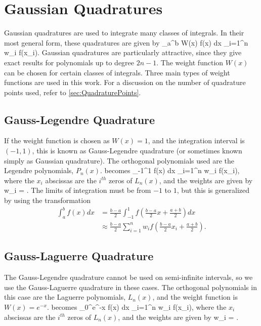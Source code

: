 \documentclass[Dissertation.tex]{subfiles}
\begin{document}
\section{Gaussian Quadratures}
\label{sec:GaussQuad}
Gaussian quadratures are used to integrate many classes of integrals. In their
most general form, these quadratures are given by \cite[p.887]{Abramowitz1965}
\beq
\label{eq:GeneralQuadratures}
\int_a^b W(x) f(x) dx \approx \sum_{i=1}^n w_i f(x_i).
\eeq
Gaussian quadratures are particularly attractive, since they give exact 
results for polynomials up to degree $2n-1$. The weight function $W(x)$ can 
be chosen for certain classes of integrals. Three main types of weight 
functions are used in this work. For a discussion on the number of quadrature 
points used, refer to \cref{sec:QuadraturePoints}.


\subsection{Gauss-Legendre Quadrature}
\label{sec:GaussLegendre}
If the weight function is chosen as $W(x)=1$, and the integration interval is $(-1,1)$, this is known as Gauss-Legendre quadrature (or sometimes known simply as Gaussian quadrature). The orthogonal polynomials used are the Legendre polynomials, $P_n(x)$.  becomes
\beq
\label{eq:GaussLeg}
\int_{-1}^1 f(x) dx \approx \sum_{i=1}^n w_i f(x_i),
\eeq
where the $x_i$ abscissas are the $i^{th}$ zeros of $L_n(x)$, and the weights are given by
\beq
\label{eq:GaussLegWeights}
w_i = .
\eeq
The limits of integration must be from $-1$ to $1$, but this is generalized by using the transformation \cite{Abramowitz1965}
\begin{align}
\label{eq:GaussLegGen}
\int_a^b f(x) dx &= \frac{b-a}{2} \int_{-1}^1 f \left(\frac{b-a}{2} x + \frac{a+b}{2}\right) dx \\
&\approx \frac{b-a}{2} \sum_{i=1}^n w_i f \left(\frac{b-a}{2} x_i + \frac{a+b}{2}\right).
\end{align}


\subsection{Gauss-Laguerre Quadrature}
\label{sec:GaussLag}
The Gauss-Legendre quadrature cannot be used on semi-infinite intervals, so we use the Gauss-Laguerre quadrature in these cases. The orthogonal polynomials in this case are the Laguerre polynomials, $L_n(x)$, and the weight function is $W(x) = e^{-x}$.  becomes
\beq
\label{eq:GaussLag}
\int_0^\infty e^{-x} f(x) dx \approx \sum_{i=1}^n w_i f(x_i),
\eeq
where the $x_i$ abscissas are the $i^{th}$ zeros of $L_n(x)$, and the weights are given by
\beq
\label{eq:GaussLagWeights}
w_i = .
\eeq
\end{document}
